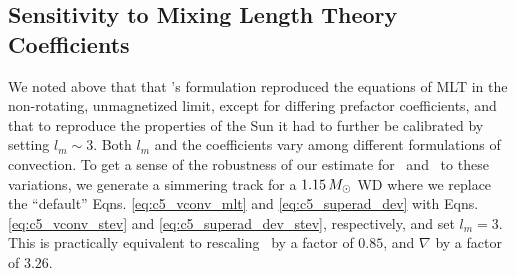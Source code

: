 


\subsection{Sensitivity to Mixing Length Theory Coefficients}
\label{ssec:c5_sensitive_apdx}

We noted above that that \citeal{stev79}'s formulation reproduced the equations of MLT in the non-rotating, unmagnetized limit, except for differing prefactor coefficients, and that to reproduce the properties of the Sun it had to further be calibrated by setting $l_m \sim 3$.  Both $l_m$ and the coefficients vary among different formulations of convection.  To get a sense of the robustness of our estimate for \Mcrit\ and \MNi\ to these variations, we generate a simmering track for a $1.15\,\Msun$ WD where we replace the ``default'' Eqns. \ref{eq:c5_vconv_mlt} and \ref{eq:c5_superad_dev} with Eqns. \ref{eq:c5_vconv_stev} and \ref{eq:c5_superad_dev_stev}, respectively, and set $l_m = 3$.  This is practically equivalent to rescaling \vconv\ by a factor of $0.85$, and $\nabla$ by a factor of $3.26$.

